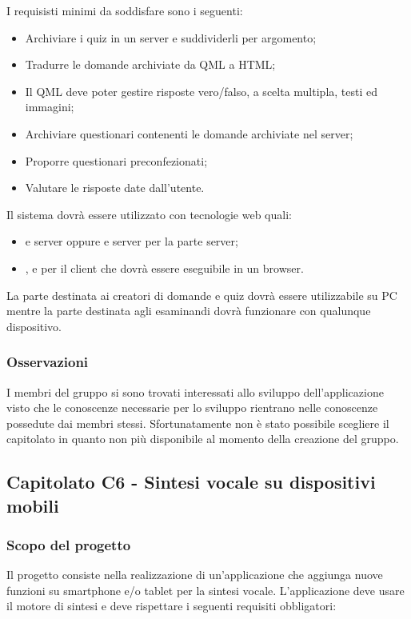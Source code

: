 I requisisti minimi da soddisfare sono i seguenti:
\begin{itemize}
	\item Archiviare i quiz in un server e suddividerli per argomento;
	\item Tradurre le domande archiviate da QML a HTML;
	\item Il QML deve poter gestire risposte vero/falso, a scelta multipla, testi ed immagini;
	\item Archiviare questionari contenenti le domande archiviate nel server;
	\item Proporre questionari preconfezionati;
	\item Valutare le risposte date dall'utente.
\end{itemize}

Il sistema dovrà essere utilizzato con tecnologie web quali:
\begin{itemize}
	\item {} e server  oppure  e server  per la parte server;
	\item {},  e  per il client che dovrà essere eseguibile in un browser.
\end{itemize}
La parte destinata ai creatori di domande e quiz dovrà essere utilizzabile su PC mentre la parte destinata agli esaminandi
dovrà funzionare con qualunque dispositivo.

\subsubsection{Osservazioni}
I membri del gruppo si sono trovati interessati allo sviluppo dell'applicazione visto che le conoscenze necessarie per lo sviluppo rientrano
nelle conoscenze possedute dai membri stessi. Sfortunatamente non è stato possibile scegliere il capitolato in quanto non più disponibile al momento
della creazione del gruppo.

\subsection{Capitolato C6 - Sintesi vocale su dispositivi mobili}
\subsubsection{Scopo del progetto}
Il progetto consiste nella realizzazione di un'applicazione che aggiunga nuove funzioni su smartphone e/o tablet per la sintesi vocale.
L'applicazione deve usare il motore di sintesi  e deve rispettare i seguenti requisiti obbligatori:

